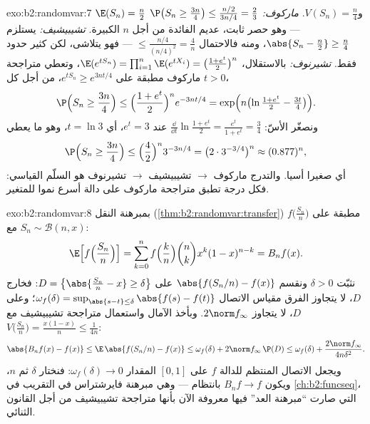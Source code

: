 \begin{solution}{exo:b2:randomvar:7}
$\E(S_n) = \frac n2$ و$V(S_n) = \frac n4$.
\emph{ماركوف:} $\P\bigl(S_n \geq \frac{3n}4\bigr) \leq
\frac{n/2}{3n/4} = \frac23$ --- وهو حصر ثابت، عديم الفائدة من أجل $n$
الكبيرة.
\emph{تشيبيشيف:} يستلزم  $\abs{S_n - \frac n2} \geq
\frac n4$، ومنه فالاحتمال $\leq \frac{n/4}{(n/4)^2} =
\frac4n$ ---
فهو يتلاشى، لكن كثير حدود فقط.
\emph{تشيرنوف:} بالاستقلال، $\E(e^{tS_n}) =
\prod_{i=1}^n\E(e^{tX_i}) = \bigl(\frac{1 + e^t}{2}\bigr)^n$، وتعطي متراجحة ماركوف مطبقة على
$e^{tS_n} \geq e^{3nt/4}$، من أجل كل $t >
0$،
\[
\P\Bigl(S_n \geq \frac{3n}4\Bigr)
\leq \Bigl(\frac{1 + e^t}{2}\Bigr)^n e^{-3nt/4}
= \exp\Bigl(n\bigl(\ln\tfrac{1 + e^t}{2} - \tfrac{3t}4\bigr)\Bigr).
\]
ونصغّر الأسّ: $\frac{\dd}{\dd t}\ln\frac{1+e^t}{2} =
\frac{e^t}{1 + e^t} = \frac34$ عند $e^t = 3$، أي $t = \ln 3$، وهو ما يعطي
\[
\P\Bigl(S_n \geq \frac{3n}4\Bigr)
\leq \Bigl(\frac{4}{2}\Bigr)^n 3^{-3n/4}
= \bigl(2 \cdot 3^{-3/4}\bigr)^n \approx (0.877)^n ,
\]
أي صغيرا أسيا. والتدرج ماركوف $\to$ تشيبيشيف $\to$ تشيرنوف هو
السلّم القياسي: فكل درجة تطبق متراجحة ماركوف على دالة أسرع نموا
للمتغير.
\end{solution}

\begin{solution}{exo:b2:randomvar:8}
بمبرهنة النقل (\cref{thm:b2:randomvar:transfer}) مطبقة على $f\bigl(\frac{S_n}{n}\bigr)$ مع $S_n \sim
\mathcal{B}(n, x)$:
\[
\E\Bigl[f\Bigl(\frac{S_n}{n}\Bigr)\Bigr]
= \sum_{k=0}^n f\Bigl(\frac kn\Bigr)\binom nk x^k(1-x)^{n-k}
= B_nf(x) .
\]
نثبّت $\delta > 0$ ونقسم $\abs{f(S_n/n) - f(x)}$ على  $D
= \bigl\{\abs{\frac{S_n}{n} - x} \geq \delta\bigr\}$: فخارج $D$، لا يتجاوز
الفرق مقياس الاتصال $\omega_f(\delta) = \sup_{\abs{s - t}\leq\delta}\abs{f(s) -
f(t)}$؛ وعلى $D$، لا يتجاوز $2\norm f_\infty$. وبأخذ
الآمال واستعمال متراجحة تشيبيشيف مع $V\bigl(\frac{S_n}{n}\bigr) =
\frac{x(1-x)}{n} \leq \frac{1}{4n}$:
\[
\abs{B_nf(x) - f(x)}
\leq \E\,\abs{f(S_n/n) - f(x)}
\leq \omega_f(\delta)
+ 2\norm f_\infty\,\P(D)
\leq \omega_f(\delta) + \frac{2\norm f_\infty}{4n\delta^2} .
\]
ويجعل الاتصال المنتظم للدالة $f$ على $[0, 1]$ المقدار $\omega_f(\delta) \to
0$:
فنختار $\delta$ ثم $n$، ويكون $B_nf \to f$ بانتظام --- وهي مبرهنة
فايرشتراس في التقريب في \cref{ch:b2:funcseq}، التي صارت ``مبرهنة العد'' فيها
معروفة الآن بأنها متراجحة تشيبيشيف من أجل القانون الثنائي.
\end{solution}


